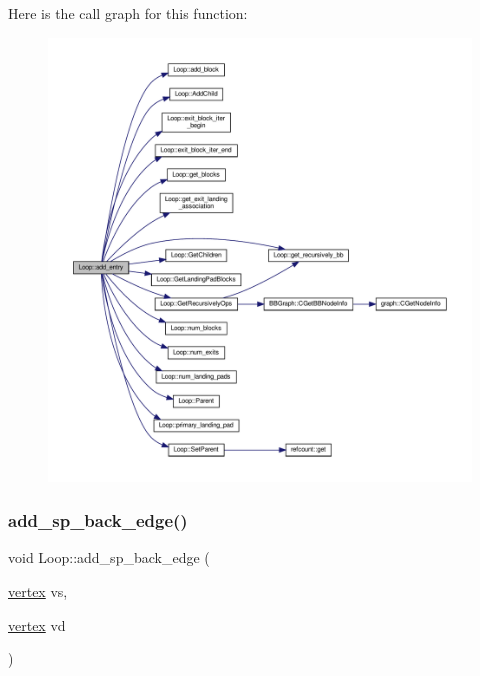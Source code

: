 Here is the call graph for this function\+:
\nopagebreak
\begin{figure}[H]
\begin{center}
\leavevmode
\includegraphics[width=350pt]{de/d77/classLoop_a5f15cc1bd67e9d5fd074785d8b766328_cgraph}
\end{center}
\end{figure}
\mbox{\label{classLoop_acc9866346319ea64ee23f01a67335018}} 
\subsubsection{\texorpdfstring{add\+\_\+sp\+\_\+back\+\_\+edge()}{add\_sp\_back\_edge()}}
{\footnotesize\ttfamily void Loop\+::add\+\_\+sp\+\_\+back\+\_\+edge (\begin{DoxyParamCaption}\item[{\hyperlink{graph_8hpp_abefdcf0544e601805af44eca032cca14}{vertex}}]{vs,  }\item[{\hyperlink{graph_8hpp_abefdcf0544e601805af44eca032cca14}{vertex}}]{vd }\end{DoxyParamCaption})\hspace{0.3cm}{\ttfamily [inline]}}



